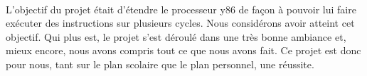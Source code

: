 \documentclass[12pt]{article}
\begin{document}
\paragraph{}L'objectif du projet était d'étendre le processeur y86 de façon à pouvoir lui faire exécuter des instructions sur plusieurs cycles. Nous considérons avoir atteint cet objectif. Qui plus est, le projet s'est déroulé dans une très bonne ambiance et, mieux encore, nous avons compris tout ce que nous avons fait. Ce projet est donc pour nous, tant sur le plan scolaire que le plan personnel, une réussite.
\end{document}
